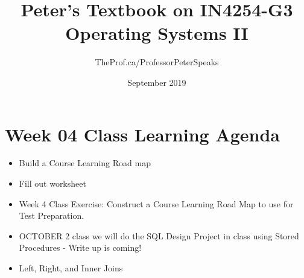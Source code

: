 \documentclass{article}
\title{Peter's Textbook on IN4254-G3 Operating Systems II}
\author{TheProf.ca/ProfessorPeterSpeaks }
\date{September 2019}
\begin{document}
\maketitle

\tableofcontents



\section * {Week 04 Class Learning Agenda}
\begin{itemize}
    \item Build a Course Learning Road map
    \item Fill out worksheet
    \item Week 4 Class Exercise: Construct a Course Learning Road Map to use for Test Preparation.
    \item OCTOBER 2 class we will do the SQL Design Project in class using Stored Procedures - Write up is coming!
    \item Left, Right, and Inner Joins
\end{itemize}










\end{document}
